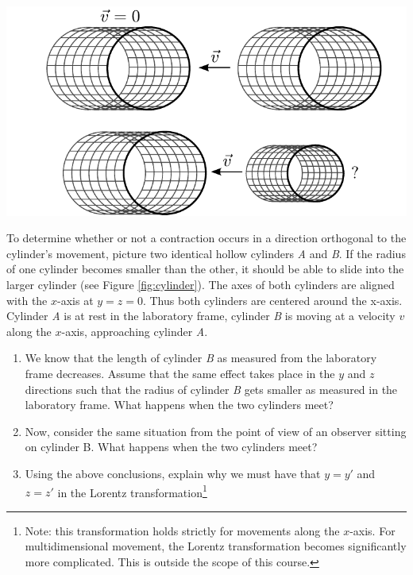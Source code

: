 {\begin{multicols}{2}
\begin{Figure}
\centering
\includegraphics[width=\textwidth]{fig_7-8.pdf}
\end{Figure}

To determine whether or not a contraction occurs in a direction orthogonal to the cylinder's movement, picture two identical hollow cylinders \textit{A} and \textit{B}.  If the radius of one cylinder becomes smaller than the other, it should be able to slide into the larger cylinder (see Figure \ref{fig:cylinder}). The axes of both cylinders are aligned with the $x$-axis at $y=z=0$. Thus both cylinders are centered around the x-axis. Cylinder \textit{A} is at rest in the laboratory frame, cylinder \textit{B} is moving at a velocity $v$ along the $x$-axis, approaching cylinder \textit{A}. 

\begin{enumerate}
\item We know that the length of cylinder \textit{B} as measured from the laboratory frame decreases. Assume that the same effect takes place in the $y$ and $z$ directions such that the radius of cylinder \textit{B} gets smaller as measured in the laboratory frame. What happens when the two cylinders meet?
\item Now, consider the same situation from the point of view of an observer sitting on cylinder B. What happens when the two cylinders meet?
\item Using the above conclusions, explain why we must have that $y=y'$ and $z=z'$ in the Lorentz transformation\footnote{Note: this transformation holds strictly for movements along the $x$-axis. For multidimensional movement, the Lorentz transformation becomes significantly more complicated. This is outside the scope of this course.}
\end{enumerate}


\end{multicols}}
